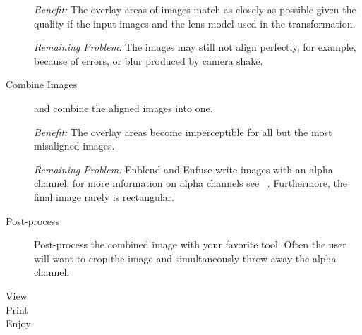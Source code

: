 \begin{description}
  \noindent\emph{Benefit:} The overlay areas of images match as closely as possible given the
  quality if the input images and the lens model used in the transformation.

  \noindent\emph{Remaining Problem:} The images may still not align perfectly, for example,
  because of  errors, or blur produced by camera shake.

\item[Combine Images]\itemend
  \App{} and \OtherApp{} combine the aligned images into one.

  \noindent\emph{Benefit:} The overlay areas become imperceptible for all but the most
  misaligned images.

  \noindent\emph{Remaining Problem:} Enblend and Enfuse write images with an alpha channel; for
  more information on alpha channels see \chapterName~.
  Furthermore, the final image rarely is rectangular.

\item[Post-process]\itemend
  Post-process the combined image with your favorite tool.  Often the user will want to crop the
  image and simultaneously throw away the alpha channel.

\item[View]

\item[Print]

\item[Enjoy]
\end{description}


